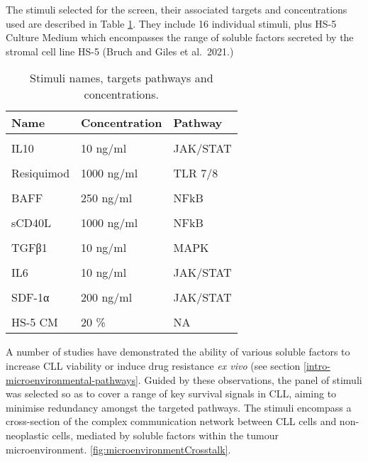 \documentclass[11pt, a4paper, twosided]{book}
\begin{document}
The stimuli selected for the screen, their associated targets and concentrations used are described in Table \ref{tab:cytTable}. They include 16 individual stimuli, plus HS-5 Culture Medium which encompasses the range of soluble factors secreted by the stromal cell line HS-5 (Bruch and Giles et al.~2021.)
\begin{table}

\caption{\label{tab:cytTable}Stimuli names, targets pathways and concentrations.}
\centering
\fontsize{7}{9}\selectfont
\begin{tabular}[t]{l|l|l}
\hline
\textbf{Name} & \textbf{Concentration} & \textbf{Pathway}\\
\hline
\cellcolor[HTML]{E2E868}{IL4} & \cellcolor[HTML]{E2E868}{10 ng/ml} & \cellcolor[HTML]{E2E868}{JAK/STAT}\\
\hline
IL10 & 10 ng/ml & JAK/STAT\\
\hline
\cellcolor[HTML]{E2E868}{IL2} & \cellcolor[HTML]{E2E868}{10 ng/ml} & \cellcolor[HTML]{E2E868}{JAK/STAT}\\
\hline
Resiquimod & 1000 ng/ml & TLR 7/8\\
\hline
\cellcolor[HTML]{E2E868}{IL21} & \cellcolor[HTML]{E2E868}{10 ng/ml} & \cellcolor[HTML]{E2E868}{JAK/STAT}\\
\hline
BAFF & 250 ng/ml & NFkB\\
\hline
\cellcolor[HTML]{E2E868}{IL1β} & \cellcolor[HTML]{E2E868}{10 ng/ml} & \cellcolor[HTML]{E2E868}{NFkB}\\
\hline
sCD40L & 1000 ng/ml & NFkB\\
\hline
\cellcolor[HTML]{E2E868}{soluble anti-IgM} & \cellcolor[HTML]{E2E868}{20000 ng/ml} & \cellcolor[HTML]{E2E868}{BCR}\\
\hline
TGFβ1 & 10 ng/ml & MAPK\\
\hline
\cellcolor[HTML]{E2E868}{IL15} & \cellcolor[HTML]{E2E868}{10 ng/ml} & \cellcolor[HTML]{E2E868}{JAK/STAT}\\
\hline
IL6 & 10 ng/ml & JAK/STAT\\
\hline
\cellcolor[HTML]{E2E868}{CpG ODN} & \cellcolor[HTML]{E2E868}{1000 ng/ml} & \cellcolor[HTML]{E2E868}{TLR 9}\\
\hline
SDF-1α & 200 ng/ml & JAK/STAT\\
\hline
\cellcolor[HTML]{E2E868}{Interferon γ} & \cellcolor[HTML]{E2E868}{5 ng/ml} & \cellcolor[HTML]{E2E868}{NFkB}\\
\hline
HS-5 CM & 20 \% & NA\\
\hline
\end{tabular}
\end{table}
A number of studies have demonstrated the ability of various soluble factors to increase CLL viability or induce drug resistance \emph{ex vivo} (see section \ref{intro-microenvironmental-pathways}. Guided by these observations, the panel of stimuli was selected so as to cover a range of key survival signals in CLL, aiming to minimise redundancy amongst the targeted pathways. The stimuli encompass a cross-section of the complex communication network between CLL cells and non-neoplastic cells, mediated by soluble factors within the tumour microenvironment. \ref{fig:microenvironmentCrosstalk}.
\end{document}
